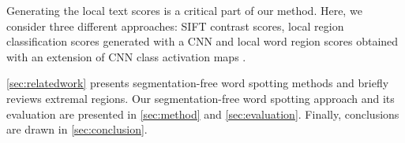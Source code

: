 Generating the local text scores is a critical part of our method. Here, we consider three different approaches:
SIFT contrast scores, local region classification scores generated with a CNN and 
local word region scores obtained with an extension of CNN class activation maps \cite{Zhou2016-LDF}.
%

\autoref{sec:relatedwork} presents segmentation-free word spotting methods and briefly reviews extremal regions.
Our segmentation-free word
spotting approach and its evaluation are presented in \autoref{sec:method} and
\autoref{sec:evaluation}. Finally, conclusions are drawn in \autoref{sec:conclusion}.
 

